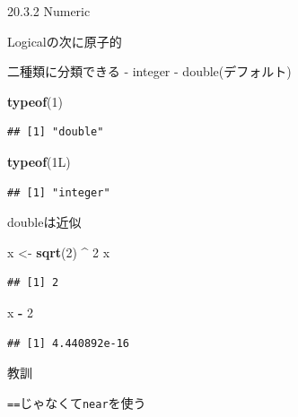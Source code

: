 \documentclass[ignorenonframetext,]{beamer}
\newenvironment{Shaded}{\begin{snugshade}}{\end{snugshade}}
\newcommand{\KeywordTok}[1]{\textcolor[rgb]{0.13,0.29,0.53}{\textbf{#1}}}
\newcommand{\DecValTok}[1]{\textcolor[rgb]{0.00,0.00,0.81}{#1}}
\newcommand{\StringTok}[1]{\textcolor[rgb]{0.31,0.60,0.02}{#1}}
\newcommand{\OperatorTok}[1]{\textcolor[rgb]{0.81,0.36,0.00}{\textbf{#1}}}
\newcommand{\NormalTok}[1]{#1}
\begin{document}
\begin{frame}[fragile]{20.3.2 Numeric}

Logicalの次に原子的

二種類に分類できる - integer - double(デフォルト)

\begin{Shaded}
\begin{Highlighting}[]
\KeywordTok{typeof}\NormalTok{(}\DecValTok{1}\NormalTok{)}
\end{Highlighting}
\end{Shaded}

\begin{verbatim}
## [1] "double"
\end{verbatim}

\begin{Shaded}
\begin{Highlighting}[]
\KeywordTok{typeof}\NormalTok{(1L)}
\end{Highlighting}
\end{Shaded}

\begin{verbatim}
## [1] "integer"
\end{verbatim}

\end{frame}

\begin{frame}[fragile]{doubleは近似}

\begin{Shaded}
\begin{Highlighting}[]
\NormalTok{x <-}\StringTok{ }\KeywordTok{sqrt}\NormalTok{(}\DecValTok{2}\NormalTok{) }\OperatorTok{^}\StringTok{ }\DecValTok{2}
\NormalTok{x}
\end{Highlighting}
\end{Shaded}

\begin{verbatim}
## [1] 2
\end{verbatim}

\begin{Shaded}
\begin{Highlighting}[]
\NormalTok{x }\OperatorTok{-}\StringTok{ }\DecValTok{2}
\end{Highlighting}
\end{Shaded}

\begin{verbatim}
## [1] 4.440892e-16
\end{verbatim}

\begin{block}{教訓}

\texttt{==}じゃなくて\texttt{near}を使う

\end{block}

\end{frame}
\end{document}
